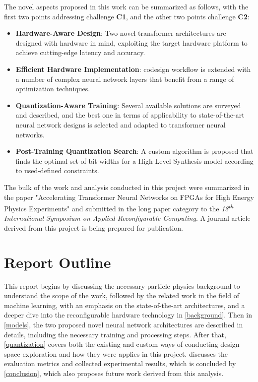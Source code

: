 The novel aspects proposed in this work can be summarized as follows, with the first two points addressing challenge \textbf{C1}, and the other two points challenge \textbf{C2}:

\begin{itemize}
  \item \textbf{Hardware-Aware Design}: Two novel transformer architectures are designed with hardware in mind, exploiting the target hardware platform to achieve cutting-edge latency and accuracy.
  
  \item \textbf{Efficient Hardware Implementation}: \hlsml codesign workflow is extended with a number of complex neural network layers that benefit from a range of optimization techniques.
  
  \item \textbf{Quantization-Aware Training}: Several available solutions are surveyed and described, and the best one in terms of applicability to state-of-the-art neural network designs is selected and adapted to transformer neural networks.
  
  \item \textbf{Post-Training Quantization Search}: A custom algorithm is proposed that finds the optimal set of bit-widths for a High-Level Synthesis model according to used-defined constraints.
\end{itemize}

The bulk of the work and analysis conducted in this project were summarized in the paper "Accelerating Transformer Neural Networks on FPGAs for High Energy Physics Experiments" and submitted in the long paper category to the \textit{18\textsuperscript{th} International Symposium on Applied Reconfigurable Computing}. A journal article derived from this project is being prepared for publication.

\section{Report Outline}
This report begins by discussing the necessary particle physics background to understand the scope of the work, followed by the related work in the field of machine learning, with an emphasis on the state-of-the-art architectures, and a deeper dive into the reconfigurable hardware technology in \cref{background}. Then in \cref{models}, the two proposed novel neural network architectures are described in details, including the necessary training and processing steps. After that, \cref{quantization} covers both the existing and custom ways of conducting design space exploration and how they were applies in this project.  discusses the evaluation metrics and collected experimental results, which is concluded by \cref{conclusion}, which also proposes future work derived from this analysis. 

